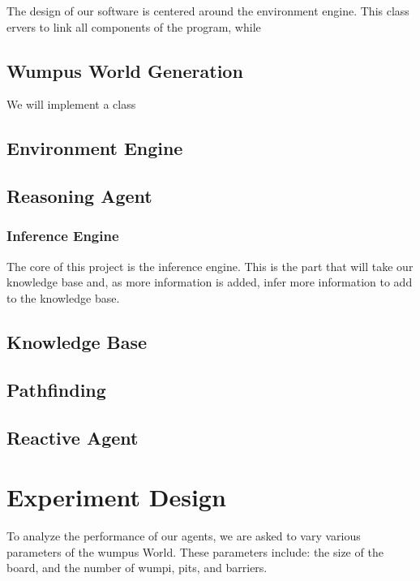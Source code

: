 \documentclass{article}
\begin{document}
		The design of our software is centered around the environment engine. This class ervers to link all components of the program, while
		
		\subsection{Wumpus World Generation}
		
		We will implement a class
		
		\subsection{Environment Engine}
		
		\subsection{Reasoning Agent}
		
			\subsubsection{Inference Engine}
			The core of this project is the inference engine. This is the part that will take our knowledge base and, as more information is added, infer more information to add to the knowledge base. 
			\subsection{Knowledge Base}
			
			\subsection{Pathfinding}
			
		\subsection{Reactive Agent}
			
		
		
	\section{Experiment Design}
	
	To analyze the performance of our agents, we are asked to vary various parameters of the wumpus World. These parameters include: the size of the board, and the number of wumpi, pits, and barriers. 
	
	
	

	




		
	
\end{document}
